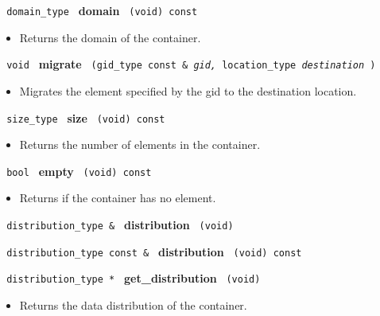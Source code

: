 
 

 
\noindent
\texttt{%
domain\_type 	
}
\textbf{domain}%
\texttt{%
(void) const
}

\begin{itemize}
\item
Returns the domain of the container.
\end{itemize}
 
\noindent
\texttt{%
void
}
\textbf{migrate}%
\texttt{%
(gid\_type const \&
\textit{gid,}
location\_type 
\textit{destination}
)
}

\begin{itemize}
\item
Migrates the element specified by the gid to the destination location. 
\end{itemize}
 
\noindent
\texttt{%
size\_type
}
\textbf{size}%
\texttt{%
(void) const
}

\begin{itemize}
\item
Returns the number of elements in the container. 
\end{itemize}
 
\noindent
\texttt{%
bool
}
\textbf{empty}%
\texttt{%
(void) const
}

\begin{itemize}
\item
Returns if the container has no element.
\end{itemize}
 
\noindent
\texttt{%
distribution\_type \& 
}
\textbf{distribution}%
\texttt{%
 (void)
}
 
\noindent
\texttt{%
distribution\_type const \& 
}
\textbf{distribution}%
\texttt{%
 (void) const
}
 
\noindent
\texttt{%
distribution\_type *
}
\textbf{get\_distribution}%
\texttt{%
(void)
}
 
\begin{itemize}
\item
Returns the data distribution of the container.
\end{itemize}

